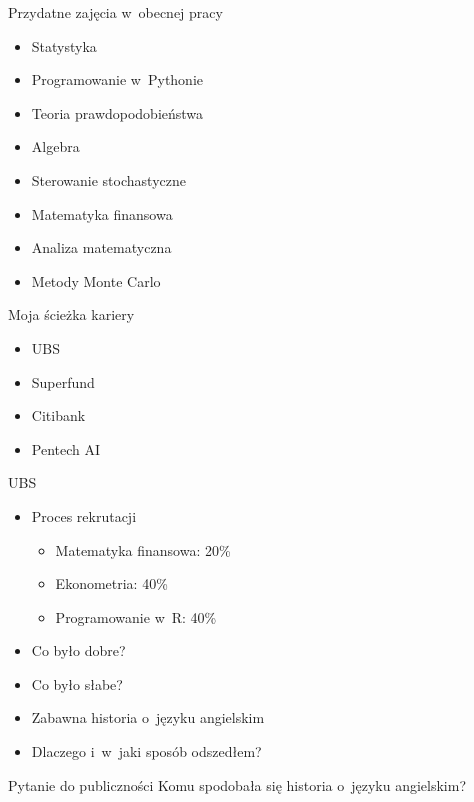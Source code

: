 \documentclass{beamer}
\begin{document}
\begin{frame}{Przydatne zajęcia w~obecnej pracy}
  \small
  \begin{itemize}
    \item Statystyka
    \item Programowanie w~Pythonie
    \item Teoria prawdopodobieństwa
    \item Algebra
    \item Sterowanie stochastyczne
    \item Matematyka finansowa
    \item Analiza matematyczna
    \item Metody Monte Carlo
  \end{itemize}
\end{frame}

\begin{frame}{Moja ścieżka kariery}
  \begin{itemize}
    \item UBS
    \item Superfund
    \item Citibank
    \item Pentech AI
  \end{itemize}
\end{frame}

\begin{frame}{UBS}
  \begin{itemize}
    \item Proces rekrutacji
      \begin{itemize}
        \item Matematyka finansowa: 20\%
        \item Ekonometria: 40\%
        \item Programowanie w~R: 40\%
      \end{itemize}
    \item Co było dobre?
    \item Co było słabe?
    \item Zabawna historia o~języku angielskim
    \item Dlaczego i~w~jaki sposób odszedłem?
  \end{itemize}
\end{frame}

\begin{frame}{Pytanie do publiczności}
  \centering
  \Large
  Komu spodobała się historia o~języku angielskim?
\end{frame}
\end{document}
